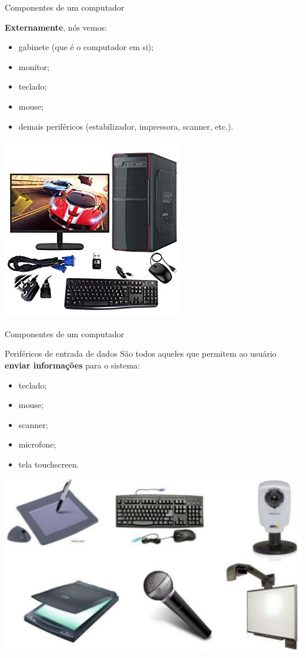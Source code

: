 \begin{frame}{Componentes de um computador}
	\begin{block}{}
		\textbf{Externamente}, nós vemos:
		\begin{itemize}
			\item gabinete (que é o computador em si);
			\item monitor;
			\item teclado;
			\item mouse;
			\item demais periféricos (estabilizador, impressora, scanner, etc.).
		\end{itemize}
	\end{block}

	\centering
	\includegraphics[width=0.35\linewidth]{Figuras/Ch01/fig23}
\end{frame}


\begin{frame}{Componentes de um computador}
	\begin{block}{Periféricos de entrada de dados}
		São todos aqueles que permitem ao usuário \textbf{enviar
			informações} para o sistema:
		\begin{itemize}
			\item teclado;
			\item mouse;
			\item scanner;
			\item microfone;
			\item tela touchscreen.
		\end{itemize}
	\end{block}

	\centering
	\includegraphics[width=0.45\linewidth]{Figuras/Ch01/fig27}
\end{frame}


